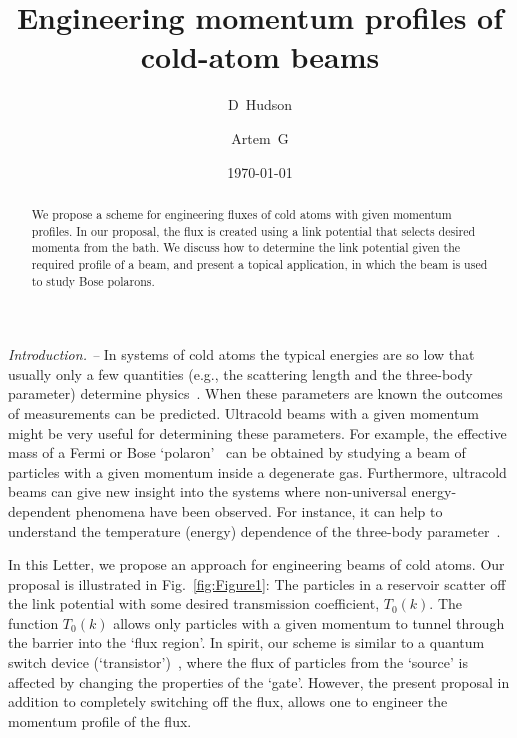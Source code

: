 \documentclass[twocolumn,amsmath,amssymb,showpacs,prl,superscriptaddress,aps]{revtex4-1}
\begin{document}
\title{Engineering momentum profiles of cold-atom beams}

\author{D~Hudson }

\author{Artem~G }


\date{\today}

\begin{abstract}
We propose a scheme for engineering fluxes of cold atoms with given momentum profiles. 
In our proposal, the flux is created using a link potential that selects desired momenta 
from the bath. We discuss how to determine the link potential given the required profile 
of a beam, and present a topical application, in which the beam is used 
to study Bose polarons. 
\end{abstract}


\maketitle



{\it Introduction. --} In systems of cold atoms the typical energies are so 
low that usually only a few quantities (e.g., the scattering length and the three-body parameter) 
determine physics~\cite{braaten2006, bloch2008}. 
When these parameters are known the outcomes of measurements can be predicted. 
Ultracold beams with a given momentum might be very useful for determining these parameters. 
For example, the effective mass of a Fermi or Bose `polaron'~\cite{zwierlein2009,hu2016,arlt2016}
can be obtained by studying a beam of particles with a given momentum inside a degenerate gas.
Furthermore, ultracold beams can give new 
insight into the systems where non-universal energy-dependent phenomena have been observed. For instance, it can help 
to understand the temperature (energy) dependence of the three-body parameter~\cite{naidon2011, huang2015, wacker2018}.


In this Letter, we propose an approach for engineering beams of cold atoms. 
Our proposal is illustrated in Fig.~\ref{fig:Figure1}: The particles in a reservoir scatter off the link potential with 
some desired transmission coefficient, $T_0(k)$. The function $T_0(k)$ allows only particles with a given momentum to 
tunnel through the barrier into the `flux region'. In spirit, our scheme is similar to a quantum switch device 
(`transistor')~\cite{zoller2004, marchukov2016}, where the flux of particles from the `source' is affected by changing the properties of the `gate'.
However, the present proposal in addition to completely switching off the flux, allows one to engineer the momentum profile of the flux.
\end{document}
